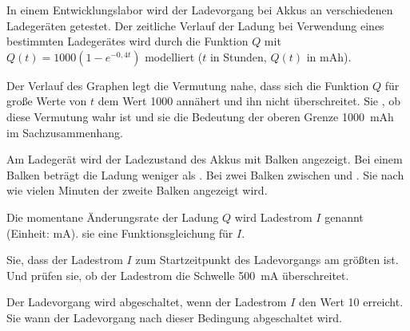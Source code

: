 \documentclass[11pt, a5paper, landscape, final]{scrartcl}
\begin{document}
	\begin{aufgabe}
		In einem Entwicklungslabor wird der Ladevorgang bei Akkus an verschiedenen Ladegeräten getestet. Der zeitliche Verlauf der Ladung bei Verwendung eines bestimmten Ladegerätes wird durch die Funktion $Q$ mit $Q(t) = 1000(1-e^{-0,4t})$ modelliert ($t$ in Stunden, $Q(t)$ in \si{mAh}).
		
		\begin{smallenumerate}
			\item Der Verlauf des Graphen legt die Vermutung nahe, dass sich die Funktion $Q$ für große Werte von $t$ dem Wert \num{1000} annähert und ihn nicht überschreitet.  Sie , ob diese Vermutung wahr ist und  sie die Bedeutung der oberen Grenze \SI{1000}{mAh} im Sachzusammenhang.
			
			\item Am Ladegerät wird der Ladezustand des Akkus mit Balken angezeigt. Bei einem Balken beträgt die Ladung weniger als . Bei zwei Balken zwischen  und .  Sie nach wie vielen Minuten der zweite Balken angezeigt wird.
			
			\item Die momentane Änderungsrate der Ladung $Q$ wird Ladestrom $I$ genannt (Einheit: \si{mA}).  sie eine Funktionsgleichung für $I$.
			
			\item {} Sie, dass der Ladestrom $I$ zum Startzeitpunkt des Ladevorgangs am größten ist. Und prüfen sie, ob der Ladestrom die Schwelle \SI{500}{mA} überschreitet.
			
			\item Der Ladevorgang wird abgeschaltet, wenn der Ladestrom $I$ den Wert \num{10} erreicht.  Sie wann der Ladevorgang nach dieser Bedingung abgeschaltet wird.
		\end{smallenumerate}
	\end{aufgabe}
	\clearpage
	
\end{document}
